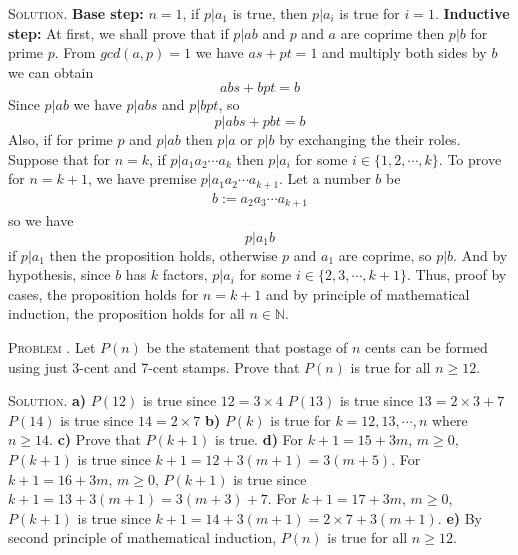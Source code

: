 \documentclass[12pt, a4paper, oneside]{article}
\newcounter{problemname}
\newenvironment{problem}{\stepcounter{problemname}\par\noindent\textsc{Problem \arabic{problemname}. }}{\\\par}
\newenvironment{solution}{\par\noindent\textsc{Solution. }}{\\\par}
\begin{document}
\begin{solution}
    \textbf{Base step:} $n = 1$, if $p | a_1$ is true, then $p | a_i$ is true for $i = 1$.
    \newline \textbf{Inductive step:} At first, we shall prove that if $p | ab$ and $p$ and $a$ are coprime then $p | b$ for prime $p$.
    From $gcd(a, p) = 1$ we have $ as + pt = 1$ and multiply both sides by $b$ we can obtain \[ abs + bpt = b\]
    Since $p | ab$ we have $p | abs$ and $p | bpt$, so \[p | abs + pbt = b\]
    Also, if for prime $p$ and $p | ab$ then $p | a$ or $p | b$ by exchanging the their roles.
    \newline \newline Suppose that for $n = k$, if $p | a_1a_2\cdots a_k$ then $p | a_i$ for some $i\in \{1,2,\cdots,k\}$.
    To prove for $n = k+1$, we have premise $p | a_1a_2\cdots a_{k+1}$. Let a number $b$ be
    \begin{align*}
        b := a_2a_3\cdots a_{k+1}
    \end{align*}
    so we have
    \[ p | a_1b\]
    if $p | a_1$ then the proposition holds, otherwise $p$ and $a_1$ are coprime, so $p | b$.
    And by hypothesis, since $b$ has $k$ factors, $p | a_i$ for some $i\in \{2,3,\cdots,k+1\}$.
    \newline\newline Thus, proof by cases, the proposition holds for $n = k+1$ and by principle of mathematical induction, the proposition holds for all $n\in \mathbb{N}$.
\end{solution}

\begin{problem}
    Let $P(n)$ be the statement that postage of $n$ cents can be formed using just 3-cent and 7-cent stamps. Prove that $P(n)$ is true for all $n\ge 12$.
\end{problem}

\begin{solution}
    \textbf{a)} $P(12)$ is true since $12 = 3\times 4$
    \newline $P(13)$ is true since $13 = 2\times 3 + 7$ 
    \newline $P(14)$ is true since $14 = 2\times 7$
    \newline\textbf{b)} $P(k)$ is true for $k = 12, 13, \cdots, n$ where $n \ge 14$.
    \newline\textbf{c)} Prove that $P(k+1)$ is true.
    \newline\textbf{d)} For $k + 1 = 15 + 3m$, $m\ge 0$, $P(k+1)$ is true since $k+1 = 12 + 3(m+1)= 3(m+5)$.
    \newline For $k + 1 = 16 + 3m$, $m\ge 0$, $P(k+1)$ is true since $k+1 = 13 + 3(m+1) = 3(m+3) + 7$.
    \newline For $k + 1 = 17 + 3m$, $m\ge 0$, $P(k+1)$ is true since $k+1 = 14 + 3(m+1) = 2\times 7 + 3(m+1)$.
    \newline\textbf{e)} By second principle of mathematical induction, $P(n)$ is true for all $n\ge 12$.
\end{solution}
\end{document}
